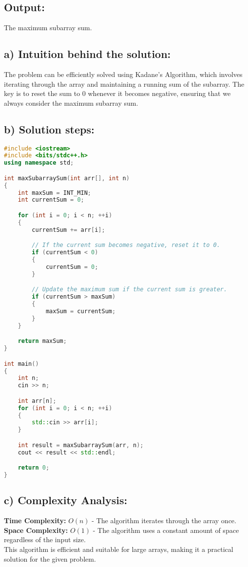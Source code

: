 \documentclass[12pt, a4paper]{report}
\begin{document}
\subsection*{Output:}
The maximum subarray sum.


\subsection*{a) Intuition behind the solution:}
The problem can be efficiently solved using Kadane's Algorithm, which involves iterating through the array and maintaining a running sum of the subarray. The key is to reset the sum to 0 whenever it becomes negative, ensuring that we always consider the maximum subarray sum.

\subsection*{b) Solution steps:}

\begin{lstlisting}[language=C++]
#include <iostream>
#include <bits/stdc++.h>
using namespace std;

int maxSubarraySum(int arr[], int n) 
{
    int maxSum = INT_MIN;
    int currentSum = 0;

    for (int i = 0; i < n; ++i) 
    {
        currentSum += arr[i];

        // If the current sum becomes negative, reset it to 0.
        if (currentSum < 0) 
        {
            currentSum = 0;
        }

        // Update the maximum sum if the current sum is greater.
        if (currentSum > maxSum) 
        {
            maxSum = currentSum;
        }
    }

    return maxSum;
}

int main() 
{
    int n;
    cin >> n;

    int arr[n];
    for (int i = 0; i < n; ++i) 
    {
        std::cin >> arr[i];
    }

    int result = maxSubarraySum(arr, n);
    cout << result << std::endl;

    return 0;
}
\end{lstlisting}

\subsection*{c) Complexity Analysis:}
\textbf{Time Complexity:} \(O(n)\) - The algorithm iterates through the array once.\\
\textbf{Space Complexity:} \(O(1)\) - The algorithm uses a constant amount of space regardless of the input size.\\
This algorithm is efficient and suitable for large arrays, making it a practical solution for the given problem.
\end{document}
